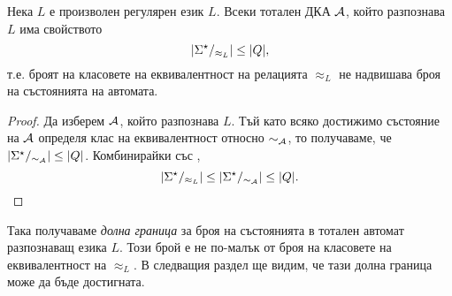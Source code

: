 \begin{framed}
  \begin{cor}
    \label{cor:upper-bound}
    Нека $L$ е произволен регулярен език $L$.  
    Всеки тотален ДКА $\mathcal{A}$, който разпознава $L$ има свойството
    \[\vert{\Sigma^\star/_{\approx_L}}\vert \leq \vert{Q}\vert,\]
    т.е. броят на класовете на еквивалентност на релацията $\approx_L$
    не надвишава броя на състоянията на автомата.
  \end{cor}  
\end{framed}
\begin{proof}
  Да изберем $\mathcal{A}$, който разпознава $L$. %
  Тъй като всяко достижимо състояние на $\mathcal{A}$ определя клас на еквивалентност относно $\sim_{\mathcal{A}}$,
  то получаваме, че $\vert{\Sigma^\star/_{\sim_{\mathcal{A}}}}\vert \leq |Q|$.
  Комбинирайки със ,
  \[\vert{\Sigma^\star/_{\approx_L}}\vert \leq \vert{\Sigma^\star/_{\sim_{\mathcal{A}}}}\vert \leq \vert{Q}\vert.\]
\end{proof}
Така получаваме {\em долна граница} за броя на състоянията в тотален автомат разпознаващ езика $L$.
Този брой е не по-малък от броя на класовете на еквивалентност на $\approx_L$.
В следващия раздел ще видим, че тази долна граница може да бъде достигната.



